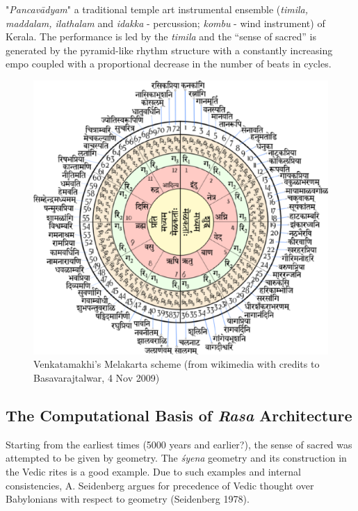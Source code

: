 "\textsl{Pancavādyam}" a traditional temple art instrumental ensemble (\textsl{timila, maddalam, ilathalam} and \textsl{idakka} - percussion; \textsl{kombu} - wind instrument) of Kerala. The performance is led by the \textsl{timila} and the “sense of sacred” is generated by the pyramid-like rhythm structure with a constantly increasing empo coupled with a proportional decrease in the number of beats in cycles.
\begin{figure}[H]
\centering
\includegraphics[scale=.4]{figures/7.eps}
\caption{Venkatamakhi’s Melakarta scheme (from wikimedia with credits to Basavarajtalwar, 4 Nov 2009)}\label{chap7-fig5}
\end{figure}

\subsection*{The Computational Basis of \textsl{Rasa} Architecture}\label{chap7-sec5.3}

Starting from the earliest times (5000 years and earlier?), the sense of sacred was attempted to be given by geometry. The \textsl{śyena} geometry and its construction in the Vedic rites is a good example. Due to such examples and internal consistencies, A. Seidenberg argues for precedence of Vedic thought over Babylonians with respect to geometry (Seidenberg 1978).

